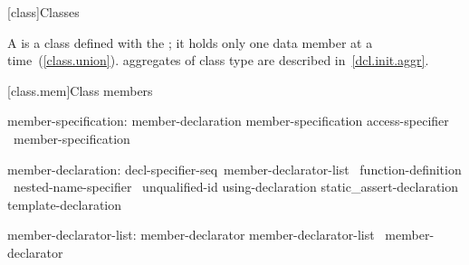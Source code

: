 \documentclass[american]{book}
\begin{document}
\setcounter{chapter}{8}
[class]{Classes}
\begin{paras}


\setcounter{Paras}{3}
\pnum
{}%
%
%
A  is a class defined with the 
;
%
it holds only one data member at a time~(\ref{class.union}).
\enternote
aggregates of class type are described in~\ref{dcl.init.aggr}.
\exitnote

\pnum
{}

\setcounter{section}{1}
[class.mem]{Class members}

%
%
%
%

\begin{bnf}
%
member-specification:\br
        member-declaration member-specification\opt\br
        access-specifier \terminal{:}\ member-specification\opt
\end{bnf}

\begin{bnf}
%
%
member-declaration:\br
         decl-specifier-seq\opt\ member-declarator-list\opt\ \terminal{;}\br
         function-definition \terminal{;\opt}\br
        \terminal{::\opt}\ nested-name-specifier \ unqualified-id \terminal{;}\br
        using-declaration\br
        static_assert-declaration\br
        template-declaration\br
\end{bnf}

\begin{bnf}
%
\br
\end{bnf}

\begin{bnf}
member-declarator-list:\br
        member-declarator\br
        member-declarator-list \terminal{,}\ member-declarator
\end{bnf}


\end{paras}
\end{document}
